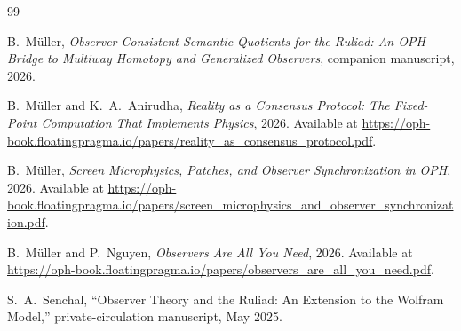 \documentclass[11pt]{article}
\theoremstyle{remark}
\theoremstyle{plain}
\begin{document}
\begin{thebibliography}{99}

B.~M\"uller,
\emph{Observer-Consistent Semantic Quotients for the Ruliad: An OPH Bridge to Multiway Homotopy and Generalized Observers},
companion manuscript, 2026.

B.~M\"uller and K.~A.~Anirudha,
\emph{Reality as a Consensus Protocol: The Fixed-Point Computation That Implements Physics},
2026.
Available at \url{https://oph-book.floatingpragma.io/papers/reality_as_consensus_protocol.pdf}.

B.~M\"uller,
\emph{Screen Microphysics, Patches, and Observer Synchronization in OPH},
2026.
Available at \url{https://oph-book.floatingpragma.io/papers/screen_microphysics_and_observer_synchronization.pdf}.

B.~M\"uller and P.~Nguyen,
\emph{Observers Are All You Need},
2026.
Available at \url{https://oph-book.floatingpragma.io/papers/observers_are_all_you_need.pdf}.

S.~A.~Senchal,
``Observer Theory and the Ruliad: An Extension to the Wolfram Model,''
private-circulation manuscript, May 2025.

\end{thebibliography}
\end{document}
